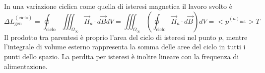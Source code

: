 In una variazione ciclica come quella di isteresi magnetica il lavoro svolto è
$$
\Delta L_{\text{gen}}^{(\text{ciclo})} = \oint_{\text{ciclo}} \iiint_{\Omega_\infty} \vec{H}_a\cdot d\vec{B} dV = \iiint_{\Omega_\infty} \left(\oint_{\text{ciclo}} \vec{H}_a \cdot d\vec{B}\right) dV = <p^{(a)_{\text{mat}}}> T 
$$
Il prodotto tra parentesi è proprio l'area del ciclo di isteresi nel punto $p$, mentre
l'integrale di volume esterno rappresenta la somma delle aree del ciclo in tutti i punti 
dello spazio. La perdita per isteresi è inoltre lineare con la frequenza di alimentazione.
